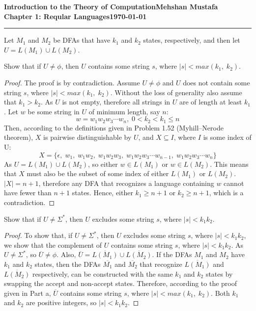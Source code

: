 \documentclass[11pt]{article}
\newcommand{\myname}{Mehshan Mustafa}
\newcommand{\dated}{\today}
\newenvironment{problem}[2][Problem]{\begin{trivlist}
\item[\hskip \labelsep {\bfseries #1}\hskip \labelsep {\bfseries #2.}]}{\end{trivlist}}
\begin{document}
\textbf{Introduction to the Theory of
Computation}\hfill\textbf{\myname}\\[0.01in]
\textbf{Chapter 1: Reqular Languages}\hfill\textbf{\dated}\\
\smallskip\hrule\bigskip

\begin{problem}{1.72}
Let $M_{1}$ and $M_{2}$ be DFAs that have $k_{1}$ and $k_{2}$ states, respectively, and then let $U = L(M_{1}) \cup L(M_{2})$.
\end{problem}

\begin{problem}[Part]{a}
Show that if $U \neq \phi$, then $U$ contains some string $s$, where $|s| < max(k_{1}, \; k_{2})$.
\end{problem}

\begin{proof}
The proof is by contradiction. Assume $U \neq \phi$ and $U$ does not contain some string $s$, where $|s| < max(k_{1}, \; k_{2})$. Without the loss of generality also assume that $k_{1} > k_{2}$. As $U$ is not empty, therefore all strings in $U$ are of length at least $k_{1}$. Let $w$ be some string in $U$ of minimum length, say $n$:
\[ w = w_{1}w_{2}w_{3} \cdots w_{n}, \; 0 < k_{2} < k_{1} \leq n\]
Then, according to the definitions given in Problem 1.52 (Myhill–Nerode theorem), $X$ is pairwise distinguishable by $U$, and $X \subseteq I$, where $I$ is some index of U:
\[ X = \{ \epsilon, \; w_{1}, \; w_{1}w_{2}, \; w_{1}w_{2}w_{3}, \; w_{1}w_{2}w_{3}\cdots w_{n - 1}, \;  w_{1}w_{2}w_{3}\cdots w_{n} \} \]
As $U = L(M_{1}) \cup L(M_{2})$, so either $w \in L(M_{1})$ or $w \in L(M_{2})$. This means that $X$ must also be the subset of some index of either $L(M_{1})$ or $L(M_{2})$. $|X| = n + 1$, therefore any DFA that recognizes a language containing $w$ cannot have fewer than $n + 1$ states. Hence, either $k_{1} \geq n + 1$ or $k_{2} \geq n + 1$, which is a contradiction.
\end{proof}

\begin{problem}[Part]{b}
Show that if $U \neq \Sigma^*$, then $U$ excludes some string $s$, where $|s| < k_{1}k_{2}$.
\end{problem}

\begin{proof}
To show that, if $U \neq \Sigma^*$, then $U$ excludes some string $s$, where $|s| < k_{1}k_{2}$, we show that the complement of $U$ contains some string $s$, where $|s| < k_{1}k_{2}$. As $U \neq \Sigma^*$, so $\overline{U} \neq \phi$. Also, $\overline{U} = \overline{L(M_{1})} \cup \overline{L(M_{2})}$. If the DFAs $M_{1}$ and $M_{2}$ have $k_{1}$ and $k_{2}$ states, then the DFAs $\overline{M_{1}}$ and $\overline{M_{2}}$ that recognize $\overline{L(M_{1})}$ and $\overline{L(M_{2})}$ respectively, can be constructed with the same $k_{1}$ and $k_{2}$ states by swapping the accept and non-accept states. Therefore, according to the proof given in Part a, $\overline{U}$ contains some string $s$, where $|s| < max(k_{1}, \; k_{2})$. Both $k_{1}$ and $k_{2}$ are positive integers, so $|s| < k_{1}k_{2}$.
\end{proof}
\end{document}
